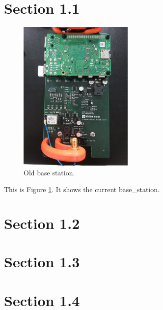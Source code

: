 \section{Section 1.1}\label{sub:sub1_1}

\begin{figure}[H]
  \centering
	\includegraphics[width=0.5\textwidth, keepaspectratio]{Chapters/Figures/Intro/old_BS.jpeg}
	\caption{Old base station.}
	\label{fig:old_BS}
\end{figure}
This is Figure \ref{fig:old_BS}. It shows the current \gls{base_station}.

\section{Section 1.2}\label{sec:sub1_2}

\section{Section 1.3}\label{sec:sub1_3}

\section{Section 1.4}\label{sec:sub1_4}
